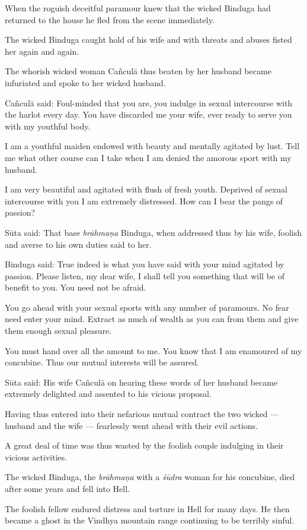 \documentclass[twoside]{purana}
\begin{document}
When the roguish deceitful paramour knew that the wicked Binduga had returned to
the house he fled from the scene immediately.

The wicked Binduga caught hold of his wife and with threats and abuses fisted
her again and again.

The whorish wicked woman Cañculā thus beaten by her husband became infuriated
and spoke to her wicked husband.

Cañculā said: Foul-minded that you are, you indulge in sexual intercourse with
the harlot every day. You have discarded me your wife, ever ready to serve you
with my youthful body.

I am a youthful maiden endowed with beauty and mentally agitated by lust. Tell
me what other course can I take when I am denied the amorous sport with my
husband.

I am very beautiful and agitated with flush of fresh youth. Deprived of sexual
intercourse with you I am extremely distressed. How can I bear the pangs of
passion?

Sūta said: That base \emph{brāhmaṇa} Binduga, when addressed thus by his wife,
foolish and averse to his own duties said to her.

Binduga said: True indeed is what you have said with your mind agitated by
passion. Please listen, my dear wife, I shall tell you something that will be
of benefit to you. You need not be afraid.

You go ahead with your sexual sports with any number of paramours. No fear need
enter your mind. Extract as much of wealth as you can from them and give them
enough sexual pleasure.

You must hand over all the amount to me. You know that I am enamoured of my
concubine. Thus our mutual interests will be assured.

Sūta said: His wife Cañculā on hearing these words of her husband became
extremely delighted and assented to his vicious proposal.

Having thus entered into their nefarious mutual contract the two wicked
— husband and the wife — fearlessly went ahead with their evil actions.

A great deal of time was thus wasted by the foolish couple indulging in their
vicious activities.

The wicked Binduga, the \emph{brāhmaṇa} with a \emph{śūdra} woman for his
concubine, died after some years and fell into Hell.

The foolish fellow endured distress and torture in Hell for many days. He then
became a ghost in the Vindhya mountain range continuing to be terribly sinful.
\end{document}
